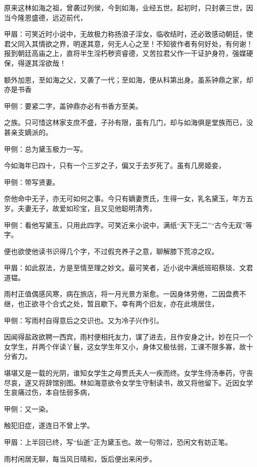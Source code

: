 \begin{parag}
    原来这林如海之祖，曾袭过列侯，今到如海，业经五世。起初时，只封袭三世，因当今隆恩盛德，远迈前代，\begin{note}甲眉：可笑近时小说中，无故极力称扬浪子淫女，临收结时，还必致感动朝廷，使君父同入其情欲之界，明遂其意，何无人心之至！不知彼作者有何好处，有何谢！报到朝廷高庙之上，直将半生淫朽秽资睿德，又苦拉君父作一干证护身符，强媒硬保，得遂其淫欲哉！\end{note}额外加恩，至如海之父，又袭了一代；至如海，便从科第出身。虽系钟鼎之家，却亦是书香\begin{note}甲侧：要紧二字，盖钟鼎亦必有书香方至美。\end{note}之族。只可惜这林家支庶不盛，子孙有限，虽有几门，却与如海俱是堂族而已，没甚亲支嫡派的。\begin{note}甲侧：总为黛玉极力一写。\end{note}今如海年已四十，只有一个三岁之子，偏又于去岁死了。虽有几房姬妾，\begin{note}甲侧：带写贤妻。\end{note}奈他命中无子，亦无可如何之事。今只有嫡妻贾氏，生得一女，乳名黛玉，年方五岁。夫妻无子，故爱如珍宝，且又见他聪明清秀，\begin{note}甲侧：看他写黛玉，只用此四字。可笑近来小说中，满纸“天下无二”“古今无双”等字。\end{note}便也欲使他读书识得几个字，不过假充养子之意，聊解膝下荒凉之叹。\begin{note}甲眉：如此叙法，方是至情至理之妙文。最可笑者，近小说中满纸班昭蔡琰、文君道韫。\end{note}
\end{parag}


\begin{parag}
    雨村正值偶感风寒，病在旅店，将一月光景方渐愈。一因身体劳倦，二因盘费不继，也正欲寻个合式之处，暂且歇下。幸有两个旧友，亦在此境居住，\begin{note}甲侧：写雨村自得意后之交识也。又为冷子兴作引。\end{note}因闻得盐政欲聘一西宾，雨村便相托友力，谋了进去，且作安身之计。妙在只一个女学生，幷两个伴读丫鬟，这女学生年又小，身体又极怯弱，工课不限多寡，故十分省力。
\end{parag}


\begin{parag}
    堪堪又是一载的光阴，谁知女学生之母贾氏夫人一疾而终。女学生侍汤奉药，守丧尽哀，遂又将辞馆别图。林如海意欲令女学生守制读书，故又将他留下。近因女学生哀痛过伤，本自怯弱多病，\begin{note}甲侧：又一染。\end{note}触犯旧症，遂连日不曾上学。\begin{note}甲眉：上半回已终，写“仙逝”正为黛玉也。故一句带过，恐闲文有妨正笔。\end{note}雨村闲居无聊，每当风日晴和，饭后便出来闲步。
\end{parag}


